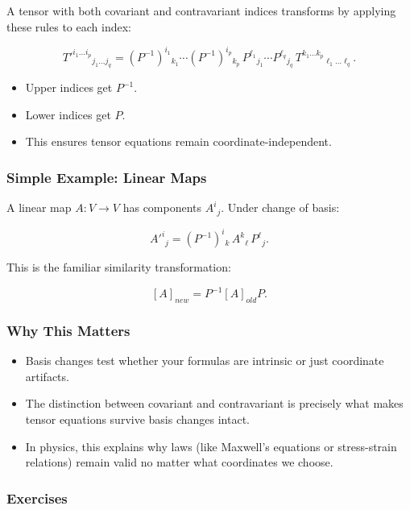 \documentclass[
  letterpaper,
  DIV=11,
  numbers=noendperiod]{scrreprt}
\providecommand{\tightlist}{%
  \setlength{\itemsep}{0pt}\setlength{\parskip}{0pt}}
\begin{document}
A tensor with both covariant and contravariant indices transforms by
applying these rules to each index:

\[
T'^{i_1 \dots i_p}{}_{j_1 \dots j_q} =
(P^{-1})^{i_1}{}_{k_1} \cdots (P^{-1})^{i_p}{}_{k_p}
\, P^{\ell_1}{}_{j_1} \cdots P^{\ell_q}{}_{j_q}
\, T^{k_1 \dots k_p}{}_{\ell_1 \dots \ell_q}.
\]

\begin{itemize}
\tightlist
\item
  Upper indices get \(P^{-1}\).
\item
  Lower indices get \(P\).
\item
  This ensures tensor equations remain coordinate-independent.
\end{itemize}

\subsubsection{Simple Example: Linear
Maps}\label{simple-example-linear-maps}

A linear map \(A: V \to V\) has components \(A^i{}_j\). Under change of
basis:

\[
A'^i{}_j = (P^{-1})^i{}_k \, A^k{}_\ell \, P^\ell{}_j.
\]

This is the familiar similarity transformation:

\[
[A]_{new} = P^{-1} [A]_{old} P.
\]

\subsubsection{Why This Matters}\label{why-this-matters-2}

\begin{itemize}
\tightlist
\item
  Basis changes test whether your formulas are intrinsic or just
  coordinate artifacts.
\item
  The distinction between covariant and contravariant is precisely what
  makes tensor equations survive basis changes intact.
\item
  In physics, this explains why laws (like Maxwell's equations or
  stress-strain relations) remain valid no matter what coordinates we
  choose.
\end{itemize}

\subsubsection{Exercises}\label{exercises-10}
\end{document}
